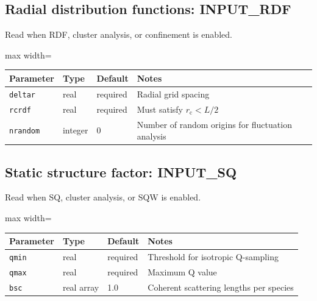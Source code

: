 \documentclass[final,1p,times]{elsarticle}
\begin{document}
\subsection{Radial distribution functions: INPUT\_RDF}
Read when RDF, cluster analysis, or confinement is enabled.
\begin{center}
\begin{adjustbox}{max width=\textwidth}
\begin{tabular}{llll}
\hline
Parameter & Type & Default & Notes \\
\hline
\texttt{deltar} & real & required & Radial grid spacing \\
\texttt{rcrdf} & real & required & Must satisfy $r_{\mathrm{c}}<L/2$ \\
\texttt{nrandom} & integer & 0 & Number of random origins for fluctuation analysis \\
\hline
\end{tabular}
\end{adjustbox}
\end{center}

\subsection{Static structure factor: INPUT\_SQ}
Read when SQ, cluster analysis, or SQW is enabled.
\begin{center}
\begin{adjustbox}{max width=\textwidth}
\begin{tabular}{llll}
\hline
Parameter & Type & Default & Notes \\
\hline
\texttt{qmin} & real & required & Threshold for isotropic Q-sampling \\
\texttt{qmax} & real & required & Maximum Q value \\
\texttt{bsc} & real array & 1.0 & Coherent scattering lengths per species \\
\hline
\end{tabular}
\end{adjustbox}
\end{center}
\end{document}
